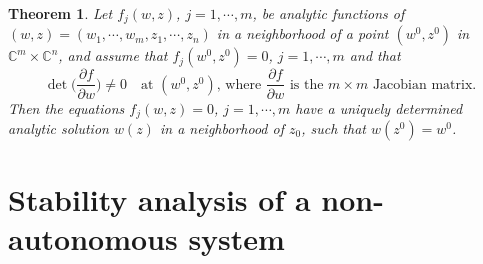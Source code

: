 \documentclass[a4paper,11pt]{article}
\newcounter{Theorem}
\newtheorem{theorem}[Theorem]{Theorem}
\theoremstyle{remark}
\begin{document}
\begin{theorem}{\cite[p. 24]{Hormander66}} \label{thm:anal} Let $f_j(w,z)$, $j=1,\cdots,m$, be analytic functions of $(w,z)=(w_1,\cdots,w_m,z_1,\cdots,z_n)$ in a neighborhood of a point $(w^0,z^0)$ in $\mathbb{C}^m\times \mathbb{C}^n$, and assume that $f_j(w^0,z^0)=0$, $j=1,\cdots,m$ and that
$$ \det\Big( \frac{\partial f}{\partial w} \Big) \ne 0 \quad \text{at $(w^0,z^0)$, where $\frac{\partial f}{\partial w}$ is the $m\times m$ Jacobian matrix.} $$
Then the equations $f_j(w,z)=0$, $j=1,\cdots,m$ have a uniquely determined analytic solution $w(z)$ in a neighborhood of $z_0$, such that $w(z^0)=w^0$.
\end{theorem}



\section{Stability analysis of a non-autonomous system}
\end{document}
